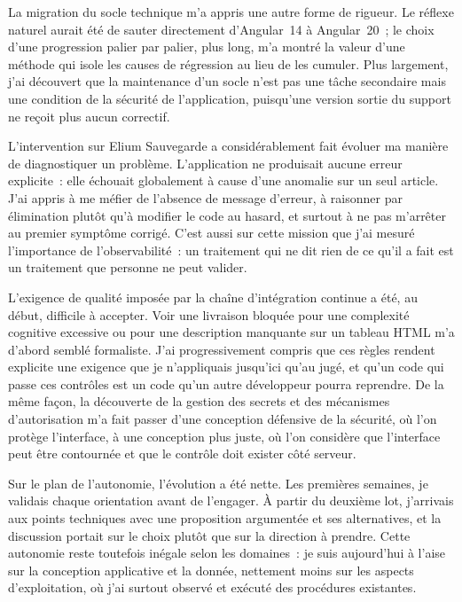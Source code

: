 La migration du socle technique m'a appris une autre forme de rigueur. Le
réflexe naturel aurait été de sauter directement d'Angular~14 à Angular~20~; le
choix d'une progression palier par palier, plus long, m'a montré la valeur d'une
méthode qui isole les causes de régression au lieu de les cumuler. Plus
largement, j'ai découvert que la maintenance d'un socle n'est pas une tâche
secondaire mais une condition de la sécurité de l'application, puisqu'une
version sortie du support ne reçoit plus aucun correctif.

L'intervention sur Elium Sauvegarde a considérablement fait évoluer ma manière
de diagnostiquer un problème. L'application ne produisait aucune erreur
explicite~: elle échouait globalement à cause d'une anomalie sur un seul
article. J'ai appris à me méfier de l'absence de message d'erreur, à raisonner
par élimination plutôt qu'à modifier le code au hasard, et surtout à ne pas
m'arrêter au premier symptôme corrigé. C'est aussi sur cette mission que j'ai
mesuré l'importance de l'observabilité~: un traitement qui ne dit rien de ce
qu'il a fait est un traitement que personne ne peut valider.

L'exigence de qualité imposée par la chaîne d'intégration continue a été, au
début, difficile à accepter. Voir une livraison bloquée pour une complexité
cognitive excessive ou pour une description manquante sur un tableau HTML m'a
d'abord semblé formaliste. J'ai progressivement compris que ces règles rendent
explicite une exigence que je n'appliquais jusqu'ici qu'au jugé, et qu'un code
qui passe ces contrôles est un code qu'un autre développeur pourra reprendre.
De la même façon, la découverte de la gestion des secrets et des mécanismes
d'autorisation m'a fait passer d'une conception défensive de la sécurité, où
l'on protège l'interface, à une conception plus juste, où l'on considère que
l'interface peut être contournée et que le contrôle doit exister côté serveur.

Sur le plan de l'autonomie, l'évolution a été nette. Les premières semaines,
je validais chaque orientation avant de l'engager. À partir du deuxième lot,
j'arrivais aux points techniques avec une proposition argumentée et ses
alternatives, et la discussion portait sur le choix plutôt que sur la direction
à prendre. Cette autonomie reste toutefois inégale selon les domaines~: je suis
aujourd'hui à l'aise sur la conception applicative et la donnée, nettement
moins sur les aspects d'exploitation, où j'ai surtout observé et exécuté des
procédures existantes.

